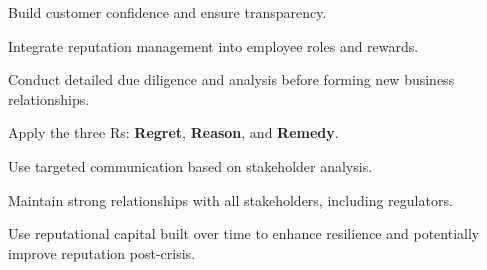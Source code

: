 
\begin{lettered}
\item Build customer confidence and ensure transparency.
\item Integrate reputation management into employee roles and rewards.
\item Conduct detailed due diligence and analysis before forming new business
relationships.
\end{lettered}

\begin{lettered}
\item Apply the three Rs: \textbf{Regret}, \textbf{Reason}, and \textbf{Remedy}.
\item Use targeted communication based on stakeholder analysis.
\end{lettered}

\begin{lettered}
\item Maintain strong relationships with all stakeholders, including regulators.
\item Use reputational capital built over time to enhance resilience and
potentially improve reputation post-crisis.
\end{lettered}
